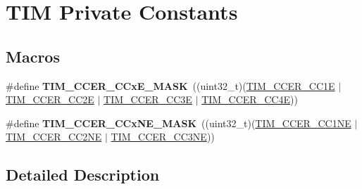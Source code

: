 \hypertarget{group___t_i_m___private___constants}{}\section{T\+IM Private Constants}
\label{group___t_i_m___private___constants}
\subsection*{Macros}
\begin{DoxyCompactItemize}
\item 
\mbox{\label{group___t_i_m___private___constants_ga5d1a1d755cda12637dfa5143130b4891}} 
\#define {\bfseries T\+I\+M\+\_\+\+C\+C\+E\+R\+\_\+\+C\+Cx\+E\+\_\+\+M\+A\+SK}~((uint32\+\_\+t)(\hyperlink{group___peripheral___registers___bits___definition_ga3f494b9881e7b97bb2d79f7ad4e79937}{T\+I\+M\+\_\+\+C\+C\+E\+R\+\_\+\+C\+C1E} $\vert$ \hyperlink{group___peripheral___registers___bits___definition_ga76392a4d63674cd0db0a55762458f16c}{T\+I\+M\+\_\+\+C\+C\+E\+R\+\_\+\+C\+C2E} $\vert$ \hyperlink{group___peripheral___registers___bits___definition_ga1da114e666b61f09cf25f50cdaa7f81f}{T\+I\+M\+\_\+\+C\+C\+E\+R\+\_\+\+C\+C3E} $\vert$ \hyperlink{group___peripheral___registers___bits___definition_ga940b041ab5975311f42f26d314a4b621}{T\+I\+M\+\_\+\+C\+C\+E\+R\+\_\+\+C\+C4E}))
\item 
\mbox{\label{group___t_i_m___private___constants_gaeae61652a005098f9fe6b398d29d4279}} 
\#define {\bfseries T\+I\+M\+\_\+\+C\+C\+E\+R\+\_\+\+C\+Cx\+N\+E\+\_\+\+M\+A\+SK}~((uint32\+\_\+t)(\hyperlink{group___peripheral___registers___bits___definition_ga813056b3f90a13c4432aeba55f28957e}{T\+I\+M\+\_\+\+C\+C\+E\+R\+\_\+\+C\+C1\+NE} $\vert$ \hyperlink{group___peripheral___registers___bits___definition_ga6a784649120eddec31998f34323d4156}{T\+I\+M\+\_\+\+C\+C\+E\+R\+\_\+\+C\+C2\+NE} $\vert$ \hyperlink{group___peripheral___registers___bits___definition_gad46cce61d3bd83b64257ba75e54ee1aa}{T\+I\+M\+\_\+\+C\+C\+E\+R\+\_\+\+C\+C3\+NE}))
\end{DoxyCompactItemize}


\subsection{Detailed Description}

